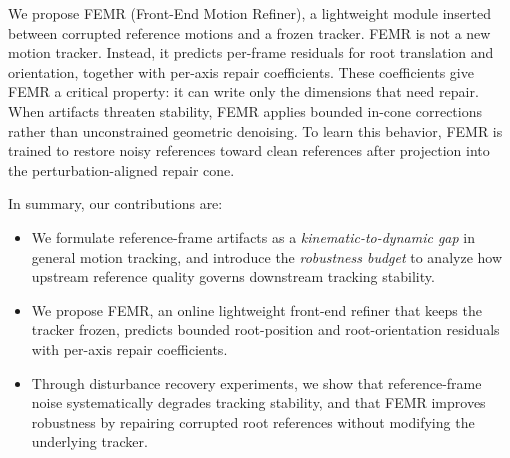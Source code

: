 \documentclass{article}
\begin{document}



	We propose FEMR (Front-End Motion Refiner), a lightweight module inserted between corrupted reference motions and a frozen tracker. FEMR is not a new motion tracker. Instead, it predicts per-frame residuals for root translation and orientation, together with per-axis repair coefficients. These coefficients give FEMR a critical property: it can write only the dimensions that need repair. When artifacts threaten stability, FEMR applies bounded in-cone corrections rather than unconstrained geometric denoising. To learn this behavior, FEMR is trained to restore noisy references toward clean references after projection into the perturbation-aligned repair cone.
	





	

	In summary, our contributions are:

	\begin{itemize}
		\item We formulate reference-frame artifacts as a \textit{kinematic-to-dynamic gap} in general motion tracking, and introduce the \textit{robustness budget} to analyze how upstream reference quality governs downstream tracking stability.
		\item We propose FEMR, an online lightweight front-end refiner that keeps the tracker frozen, predicts bounded root-position and root-orientation residuals with per-axis repair coefficients.
		\item Through disturbance recovery experiments, we show that reference-frame noise systematically degrades tracking stability, and that FEMR improves robustness by repairing corrupted root references without modifying the underlying tracker.
	\end{itemize}
\end{document}
